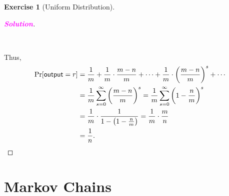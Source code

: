 \documentclass[12pt,openany]{book}
\theoremstyle{definition}
\newtheorem{exercise}{Exercise}[chapter]
\newcommand{\sol}{\textcolor{magenta}{\bf Solution}}
\begin{document}
\begin{exercise}[Uniform Distribution]
\begin{proof}[\sol]
\begin{table}[h!]
\begin{tabularx}{\textwidth}{c||c|c|c|c}
					\bottomrule[1.2pt]
				\end{tabularx}
			\end{table}\\ Thus, \begin{align*}
				\Pr[\mathsf{output}=r]&=\frac{1}{m}+\frac{1}{m}\cdot\frac{m-n}{m}+\cdots+\frac{1}{m}\cdot\del{\frac{m-n}{m}}^s+\cdots\\
				&=\frac{1}{m}\sum_{s=0}^\infty\del{\frac{m-n}{m}}^s=\frac{1}{m}\sum_{s=0}^\infty\del{1-\frac{n}{m}}^s\\
				&=\frac{1}{m}\cdot\frac{1}{1-\del{1-\frac{n}{m}}}=\frac{1}{m}\cdot\frac{m}{n}\\
				&=\frac{1}{n}.
			\end{align*}
		\end{proof}
	\end{exercise}

	\newpage
	\chapter{Markov Chains}
	
\end{document}
